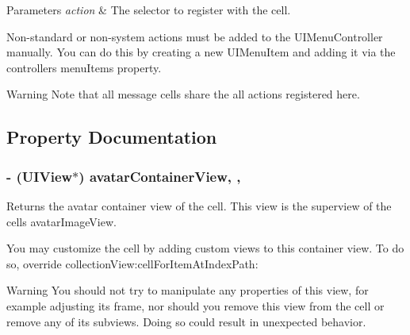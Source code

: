 \begin{DoxyParams}{Parameters}
{\em action} & The selector to register with the cell.\\
\hline
\end{DoxyParams}
Non-\/standard or non-\/system actions must be added to the {\ttfamily U\+I\+Menu\+Controller} manually. You can do this by creating a new {\ttfamily U\+I\+Menu\+Item} and adding it via the controller\textquotesingle{}s {\ttfamily menu\+Items} property.

\begin{DoxyWarning}{Warning}
Note that all message cells share the all actions registered here. 
\end{DoxyWarning}


\subsection{Property Documentation}
\hypertarget{interface_j_s_q_messages_collection_view_cell_a5cd207504172b57ba6942158dc46e294}{}
\subsubsection[{avatar\+Container\+View}]{\setlength{\rightskip}{0pt plus 5cm}-\/ (U\+I\+View$\ast$) avatar\+Container\+View\hspace{0.3cm}{\ttfamily [read]}, {\ttfamily [nonatomic]}, {\ttfamily [weak]}}\label{interface_j_s_q_messages_collection_view_cell_a5cd207504172b57ba6942158dc46e294}
Returns the avatar container view of the cell. This view is the superview of the cell\textquotesingle{}s avatar\+Image\+View.

You may customize the cell by adding custom views to this container view. To do so, override {\ttfamily collection\+View\+:cell\+For\+Item\+At\+Index\+Path\+:}

\begin{DoxyWarning}{Warning}
You should not try to manipulate any properties of this view, for example adjusting its frame, nor should you remove this view from the cell or remove any of its subviews. Doing so could result in unexpected behavior. 
\end{DoxyWarning}
\hypertarget{interface_j_s_q_messages_collection_view_cell_a23cc2af0baa373c2c6712d399ac88999}{}

